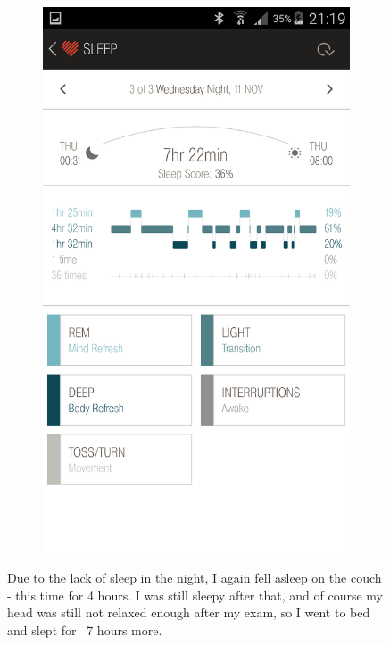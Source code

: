 \documentclass[12pt,a4paper]{article}
\begin{document}
\begin{figure}[H]
\begin{subfigure}[b]{0.5\textwidth}
        \includegraphics[width=\textwidth]{11-11-15-3.png}
    \end{subfigure}
\caption{Due to the lack of sleep in the night, I again fell asleep on the couch - this time for 4 hours. I was still sleepy after that, and of course my head was still not relaxed enough after my exam, so I went to bed and slept for ~7 hours more.}
\end{figure}

\newpage
\end{document}
